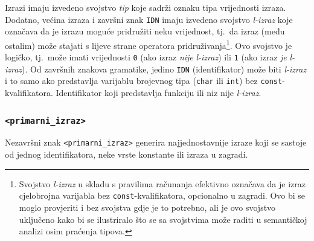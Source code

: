 \documentclass[times, 12pt, utf8]{book}
\begin{document}
Izrazi imaju izvedeno svojstvo \emph{tip} koje sadrži oznaku tipa vrijednosti izraza.
Dodatno, većina izraza i završni znak \verb|IDN| imaju izvedeno svojstvo \emph{l-izraz} koje označava da je izrazu moguće pridružiti neku vrijednost, tj.~da izraz (među ostalim) može stajati s lijeve strane operatora pridruživanja\footnote{Svojstvo \emph{l-izraz} u skladu s pravilima računanja efektivno označava da je izraz cjelobrojna varijabla bez \texttt{const}-kvalifikatora, opcionalno u zagradi. Ovo bi se moglo provjeriti i bez svojstva gdje je to potrebno, ali je ovo svojstvo uključeno kako bi se ilustriralo što se sa svojstvima može raditi u semantičkoj analizi osim praćenja tipova.}.
Ovo svojstvo je logičko, tj.~može imati vrijednosti \verb|0| (ako izraz \emph{nije} \emph{l-izraz}) ili \verb|1| (ako izraz \emph{je} \emph{l-izraz}).
Od završnih znakova gramatike, jedino \verb|IDN| (identifikator) može biti \emph{l-izraz} i to samo ako predstavlja varijablu brojevnog tipa (\verb|char| ili \verb|int|) bez \verb|const|-kvalifikatora.
Identifikator koji predstavlja funkciju ili niz nije \emph{l-izraz}.

\subsubsection{\texttt{<primarni\_izraz>}}

Nezavršni znak \verb|<primarni_izraz>| generira najjednostavnije izraze koji se sastoje od jednog identifikatora, neke vrste konstante ili izraza u zagradi.
\end{document}
